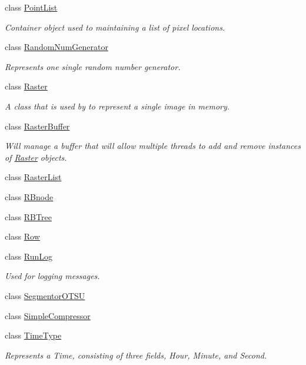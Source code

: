 \begin{DoxyCompactItemize}
class \hyperlink{class_k_k_b_1_1_point_list}{Point\+List}
\begin{DoxyCompactList}\small\item\em Container object used to maintaining a list of pixel locations. \end{DoxyCompactList}\item 
class \hyperlink{class_k_k_b_1_1_random_num_generator}{Random\+Num\+Generator}
\begin{DoxyCompactList}\small\item\em Represents one single random number generator. \end{DoxyCompactList}\item 
class \hyperlink{class_k_k_b_1_1_raster}{Raster}
\begin{DoxyCompactList}\small\item\em A class that is used by to represent a single image in memory. \end{DoxyCompactList}\item 
class \hyperlink{class_k_k_b_1_1_raster_buffer}{Raster\+Buffer}
\begin{DoxyCompactList}\small\item\em Will manage a buffer that will allow multiple threads to add and remove instances of \textquotesingle{}\hyperlink{class_k_k_b_1_1_raster}{Raster}\textquotesingle{} objects. \end{DoxyCompactList}\item 
class \hyperlink{class_k_k_b_1_1_raster_list}{Raster\+List}
\item 
class \hyperlink{class_k_k_b_1_1_r_bnode}{R\+Bnode}
\item 
class \hyperlink{class_k_k_b_1_1_r_b_tree}{R\+B\+Tree}
\item 
class \hyperlink{class_k_k_b_1_1_row}{Row}
\item 
class \hyperlink{class_k_k_b_1_1_run_log}{Run\+Log}
\begin{DoxyCompactList}\small\item\em Used for logging messages. \end{DoxyCompactList}\item 
class \hyperlink{class_k_k_b_1_1_segmentor_o_t_s_u}{Segmentor\+O\+T\+SU}
\item 
class \hyperlink{class_k_k_b_1_1_simple_compressor}{Simple\+Compressor}
\item 
class \hyperlink{class_k_k_b_1_1_time_type}{Time\+Type}
\begin{DoxyCompactList}\small\item\em Represents a Time, consisting of three fields, Hour, Minute, and Second. 


\end{DoxyCompactList}
\end{DoxyCompactItemize}
